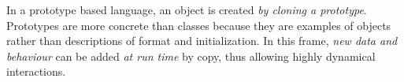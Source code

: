 \documentclass[10pt]{article}  %
\begin{document}
    In a prototype based language, an object is created \emph{by cloning  a prototype}. Prototypes are more concrete
    than classes because they are examples of objects rather than descriptions of format and initialization.
    In this frame, \emph{new data and behaviour} can be added \emph{at run time} by copy, thus allowing highly dynamical interactions.


\end{document}
